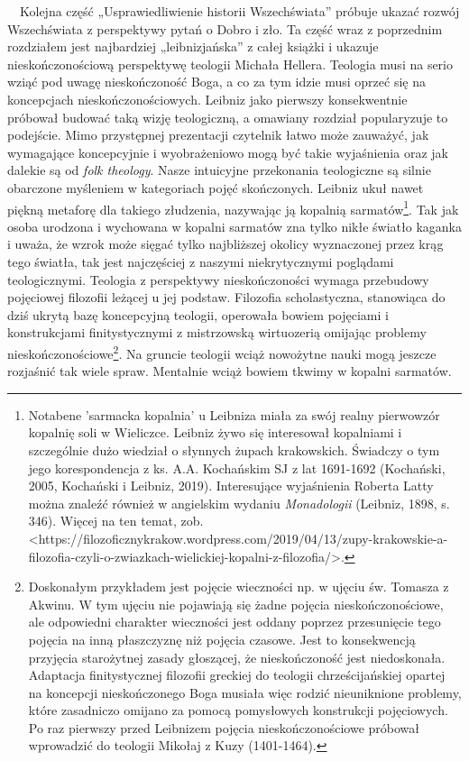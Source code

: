 \documentclass[a4paper]{article}
\newcommand\textstyleDomylnaczcionkaakapitu[1]{#1}
\begin{document}
\ \ Kolejna część „Usprawiedliwienie historii Wszechświata” próbuje ukazać rozwój Wszechświata z perspektywy pytań o
Dobro i zło. Ta część wraz z poprzednim rozdziałem jest najbardziej „leibnizjańska” z całej książki i ukazuje
nieskończonościową perspektywę teologii Michała Hellera. Teologia musi na serio wziąć pod uwagę nieskończoność Boga, a
co za tym idzie musi oprzeć się na koncepcjach nieskończonościowych. Leibniz jako pierwszy konsekwentnie próbował
budować taką wizję teologiczną, a omawiany rozdział popularyzuje to podejście. Mimo przystępnej prezentacji czytelnik
łatwo może zauważyć, jak wymagające koncepcyjnie i wyobrażeniowo mogą być takie wyjaśnienia oraz jak dalekie są od
\textstyleDomylnaczcionkaakapitu{\textit{folk theology}}. Nasze intuicyjne przekonania teologiczne są silnie obarczone
myśleniem w kategoriach pojęć skończonych. Leibniz ukuł nawet piękną metaforę dla takiego złudzenia, nazywając ją
kopalnią sarmatów\footnote{Notabene 'sarmacka kopalnia' u Leibniza miała za swój realny pierwowzór kopalnię soli w
Wieliczce. Leibniz żywo się interesował kopalniami i szczególnie dużo wiedział o słynnych żupach krakowskich. Świadczy
o tym jego korespondencja z ks. A.A. Kochańskim SJ z lat 1691-1692 (Kochański, 2005,
\textcolor[rgb]{0.80784315,0.09411765,0.11764706}{Kochański i Leibniz, 2019)}. Interesujące wyjaśnienia Roberta Latty
można znaleźć również w angielskim wydaniu \textstyleDomylnaczcionkaakapitu{\textit{Monadologii }}(Leibniz, 1898, s.
346). Więcej na ten temat, zob.
{\textless}https://filozoficznykrakow.wordpress.com/2019/04/13/zupy-krakowskie-a-filozofia-czyli-o-zwiazkach-wielickiej-kopalni-z-filozofia/{\textgreater}.}.
Tak jak osoba urodzona i wychowana w kopalni sarmatów zna tylko nikłe światło kaganka i uważa, że wzrok może sięgać
tylko najbliższej okolicy wyznaczonej przez krąg tego światła, tak jest najczęściej z naszymi niekrytycznymi poglądami
teologicznymi. Teologia z perspektywy nieskończoności wymaga przebudowy pojęciowej filozofii leżącej u jej podstaw.
Filozofia scholastyczna, stanowiąca do dziś ukrytą bazę koncepcyjną teologii, operowała bowiem pojęciami i
konstrukcjami finitystycznymi z mistrzowską wirtuozerią omijając problemy nieskończonościowe\footnote{Doskonałym
przykładem jest pojęcie wieczności np. w ujęciu św. Tomasza z Akwinu. W tym ujęciu nie pojawiają się żadne pojęcia
nieskończonościowe, ale odpowiedni charakter wieczności jest oddany poprzez przesunięcie tego pojęcia na inną
płaszczyznę niż pojęcia czasowe. Jest to konsekwencją przyjęcia starożytnej zasady głoszącej, że nieskończoność jest
niedoskonała. Adaptacja finitystycznej filozofii greckiej do teologii chrześcijańskiej opartej na koncepcji
nieskończonego Boga musiała więc rodzić nieuniknione problemy, które zasadniczo omijano za pomocą pomysłowych
konstrukcji pojęciowych. Po raz pierwszy przed Leibnizem pojęcia nieskończonościowe próbował wprowadzić do teologii
Mikołaj z Kuzy (1401-1464).}. Na gruncie teologii wciąż nowożytne nauki mogą jeszcze rozjaśnić tak wiele spraw.
Mentalnie wciąż bowiem tkwimy w kopalni sarmatów.
\end{document}
